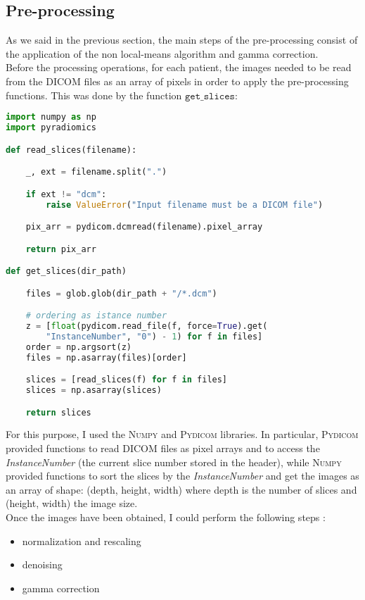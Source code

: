 \documentclass{standalone}
\begin{document}
\subsection{Pre-processing}

As we said in the previous section, the main steps of the pre-processing consist of the application of the non local-means algorithm and gamma correction.
\\
Before the processing operations, for each patient, the images needed to be read from the DICOM files as an array of pixels in order to apply the pre-processing functions.
This was done by the function $\mathtt{get\_slices}$: 

\begin{lstlisting}[language = python, caption=$\mathtt{get\_slices}$ implementation]
import numpy as np 
import pyradiomics

def read_slices(filename):

    _, ext = filename.split(".")

    if ext != "dcm":
        raise ValueError("Input filename must be a DICOM file")

    pix_arr = pydicom.dcmread(filename).pixel_array

    return pix_arr

def get_slices(dir_path)

    files = glob.glob(dir_path + "/*.dcm")

    # ordering as istance number
    z = [float(pydicom.read_file(f, force=True).get(
        "InstanceNumber", "0") - 1) for f in files]
    order = np.argsort(z)
    files = np.asarray(files)[order]

    slices = [read_slices(f) for f in files]
    slices = np.asarray(slices)

    return slices

\end{lstlisting}

For this purpose, I used the \textsc{Numpy} \cite{Numpy} and \textsc{Pydicom} \cite{Pydicom} libraries.
In particular, \textsc{Pydicom} provided functions to read DICOM files as pixel arrays and to access the \textit{InstanceNumber} (the current slice number stored in the header), while \textsc{Numpy} provided functions to sort the slices by the \textit{InstanceNumber} and get the images as an array of shape: (depth, height, width) where depth is the number of slices and (height, width) the image size.
\\
Once the images have been obtained, I could perform the following steps :
\begin{itemize}
    \item normalization and rescaling
    \item denoising
    \item gamma correction
\end{itemize}
\end{document}
